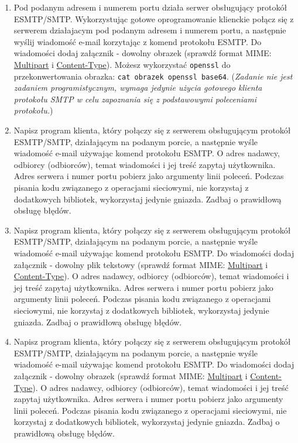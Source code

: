 \documentclass{article}
\begin{document}
\begin{enumerate}[label=\textbf{6.\arabic*}]
\item Pod podanym adresem i numerem portu działa serwer obsługujący protokół ESMTP/SMTP. Wykorzystując gotowe oprogramowanie klienckie połącz się z serwerem działajacym pod podanym adresem i numerem portu, a następnie wyślij wiadomość e-mail korzytając z komend protokołu ESMTP. Do wiadomości dodaj załącznik - dowolny obrazek (sprawdź format MIME: \href{https://www.w3.org/Protocols/rfc1341/7_2_Multipart.html}{Multipart} i \href{https://www.w3.org/Protocols/rfc1341/7_3_Message.html}{Content-Type}). Możesz wykorzystać \texttt{openssl} do przekonwertowania obrazka: \texttt{cat obrazek \textbar  openssl base64}. (\textit{Zadanie nie jest zadaniem programistycznym, wymaga jedynie użycia gotowego klienta protokołu SMTP w celu zapoznania się z podstawowymi poleceniami protokołu.})

\item Napisz program klienta, który połączy się z serwerem obsługującym protokół ESMTP/SMTP, działającym  na podanym porcie, a następnie wyśle wiadomość e-mail używając komend protokołu ESMTP. O adres nadawcy, odbiorcy (odbiorców), temat wiadomości i jej treść zapytaj użytkownika. Adres serwera i numer portu pobierz jako argumenty linii poleceń. Podczas pisania kodu związanego z operacjami sieciowymi, nie korzystaj z dodatkowych bibliotek, wykorzystaj jedynie gniazda. Zadbaj o prawidłową obsługę błędów. 

\item Napisz program klienta, który połączy się z serwerem obsługującym protokół ESMTP/SMTP, działającym  na podanym porcie, a następnie wyśle wiadomość e-mail używając komend protokołu ESMTP.  Do wiadomości dodaj załącznik - dowolny plik tekstowy (sprawdź format MIME: \href{https://www.w3.org/Protocols/rfc1341/7_2_Multipart.html}{Multipart} i \href{https://www.w3.org/Protocols/rfc1341/7_3_Message.html}{Content-Type}).  O adres nadawcy, odbiorcy (odbiorców), temat wiadomości i jej treść zapytaj użytkownika. Adres serwera i numer portu pobierz jako argumenty linii poleceń. Podczas pisania kodu związanego z operacjami sieciowymi, nie korzystaj z dodatkowych bibliotek, wykorzystaj jedynie gniazda. Zadbaj o prawidłową obsługę błędów. 

\item Napisz program klienta, który połączy się z serwerem obsługującym protokół ESMTP/SMTP, działającym  na podanym porcie, a następnie wyśle wiadomość e-mail używając komend protokołu ESMTP.  Do wiadomości dodaj załącznik - dowolny obrazek (sprawdź format MIME: \href{https://www.w3.org/Protocols/rfc1341/7_2_Multipart.html}{Multipart} i \href{https://www.w3.org/Protocols/rfc1341/7_3_Message.html}{Content-Type}).  O adres nadawcy, odbiorcy (odbiorców), temat wiadomości i jej treść zapytaj użytkownika. Adres serwera i numer portu pobierz jako argumenty linii poleceń. Podczas pisania kodu związanego z operacjami sieciowymi, nie korzystaj z dodatkowych bibliotek, wykorzystaj jedynie gniazda. Zadbaj o prawidłową obsługę błędów.

\end{enumerate}
\end{document}
